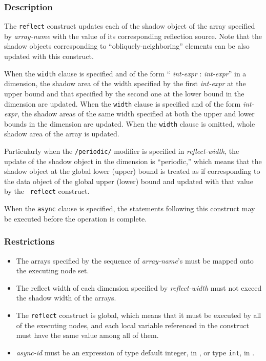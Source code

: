 \subsubsection*{Description}

The {\tt reflect} construct updates each of the shadow object of the
array specified by {\it array-name} with the value of its corresponding
reflection source. Note that the shadow objects corresponding to
``obliquely-neighboring'' elements can be also updated with this
construct.


When the {\tt width} clause is specified and of the form ``{\it
int-expr} : {\it int-expr}'' in a dimension, the shadow area of the
width specified by the first {\it int-expr} at the upper bound and that
specified by the second one at the lower bound in the dimension are
updated.
%
When the {\tt width} clause is specified and of the form {\it int-expr},
the shadow areas of the same width specified at both the upper
and lower bounds in the dimension are updated.
%
When the {\tt width} clause is omitted, whole shadow area of the array
is updated.

Particularly when the {\tt /periodic/} modifier is specified in {\it
reflect-width}, the update of the shadow object in the dimension is
``periodic,'' which means that the shadow object at the global lower
(upper) bound is treated as if corresponding to the data object of the
global upper (lower) bound and updated with that value by the {\tt
reflect} construct.

When the {\tt async} clause is specified, the statements following this
construct may be executed before the operation is complete.

\subsubsection*{Restrictions}

\begin{itemize}
 \item The arrays specified by the sequence of {\it array-name}'s must
       be mapped onto the executing node set.
 \item The reflect width of each dimension specified by {\it
       reflect-width} must not exceed the shadow width of the arrays.
 \item The {\tt reflect} construct is global, which means that it must be
       executed by all of the executing nodes, and each local variable
       referenced in the construct must have the same value among all of
       them.
 \item {\it async-id} must be an expression of type default integer, in
       {\XMPF}, or type {\tt int}, in {\XMPC}.
\end{itemize}

